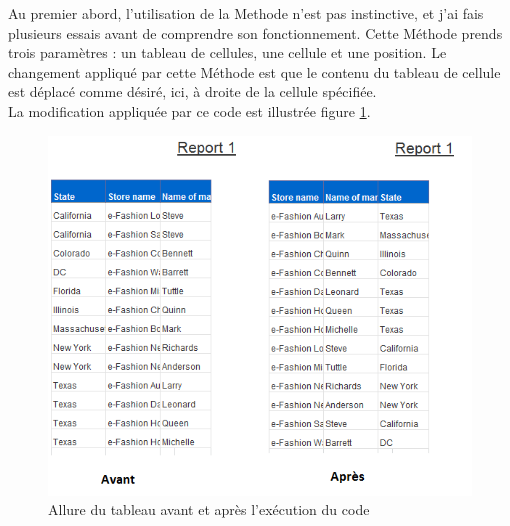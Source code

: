 Au premier abord, l'utilisation de la \gls{Methode}  n'est pas instinctive, et j'ai fais plusieurs essais avant de comprendre son fonctionnement. Cette M\'{e}thode prends trois param\`{e}tres : un tableau de cellules, une cellule et une position. Le changement appliqu\'{e} par cette M\'{e}thode est que le contenu du tableau de cellule est d\'{e}plac\'{e} comme d\'{e}sir\'{e}, ici, \`{a} droite de la cellule sp\'{e}cifi\'{e}e.\\
La modification appliqu\'{e}e par ce code est illustr\'{e}e figure \ref{figure:dropcells}.\\

\begin{figure}[!h]
  \centering
      \includegraphics{images/dropcells.png}
  \caption{Allure du tableau avant et apr\`{e}s l'ex\'{e}cution du code}
	\label{figure:dropcells}
\end{figure}





